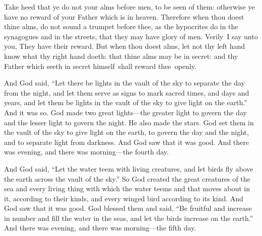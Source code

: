 \documentclass{grattanAlpha}
\begin{document}
Take heed that ye do not your alms before men, to be seen of them: otherwise ye have no reward of your Father which is in heaven. Therefore when thou doest thine alms, do not sound a trumpet before thee, as the hypocrites do in the synagogues and in the streets, that they may have glory of men. Verily~I say unto you, They have their reward.  But when thou doest alms, let not thy left hand know what thy right hand doeth: that thine alms may be in secret: and thy Father which seeth in secret himself~shall reward thee~openly.

And God said, “Let there be lights in the vault of the sky to separate the day from the night, and let them serve as signs to mark sacred times, and days and years, and let them be lights in the vault of the sky to give light on the earth.” And it was so. God made two great lights—the greater light to govern the day and the lesser light to govern the night. He also made the stars. God set them in the vault of the sky to give light on the earth, to govern the day and the night, and to separate light from darkness. And God saw that it was good. And there was evening, and there was morning—the fourth day.

And God said, “Let the water teem with living creatures, and let birds fly above the earth across the vault of the sky.” So God created the great creatures of the sea and every living thing with which the water teems and that moves about in it, according to their kinds, and every winged bird according to its kind. And God saw that it was good. God blessed them and said, “Be fruitful and increase in number and fill the water in the seas, and let the birds increase on the earth.” And there was evening, and there was morning—the fifth day.
\end{document}
